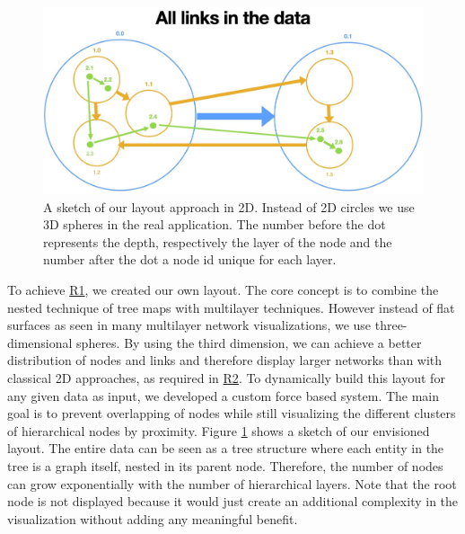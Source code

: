 \begin{figure}[h]
    \centering
    \includegraphics[width=\textwidth, trim={0cm 0cm 0cm 3.5cm},clip]{graphics/filterLinks/allLinks.jpg}
    \caption[A sketch of our layout in 2D.]{A sketch of our layout approach in 2D. Instead of 2D circles we use 3D spheres in the real application. The number before the dot represents the depth, respectively the layer of the node and the number after the dot a node id unique for each layer.} 
    \label{fig:layoutSketch} 
\end{figure}
To achieve \hyperref[req:R1]{R1}, we created our own layout. The core concept is to combine the nested technique of tree maps with multilayer techniques. However instead of flat surfaces as seen in many multilayer network visualizations, we use three-dimensional spheres. 
By using the third dimension, we can achieve a better distribution of nodes and links and therefore display larger networks than with classical 2D approaches, as required in \hyperref[req:R2]{R2}. 
To dynamically build this layout for any given data as input, we developed a custom force based system.
The main goal is to prevent overlapping of nodes while still visualizing the different clusters of hierarchical nodes by proximity. Figure \ref{fig:layoutSketch} shows a sketch of our envisioned layout. The entire data can be seen as a tree structure where each entity in the tree is a graph itself, nested in its parent node. Therefore, the number of nodes can grow exponentially with the number of hierarchical layers. Note that the root node is not displayed because it would just create an additional complexity in the visualization without adding any meaningful benefit.

